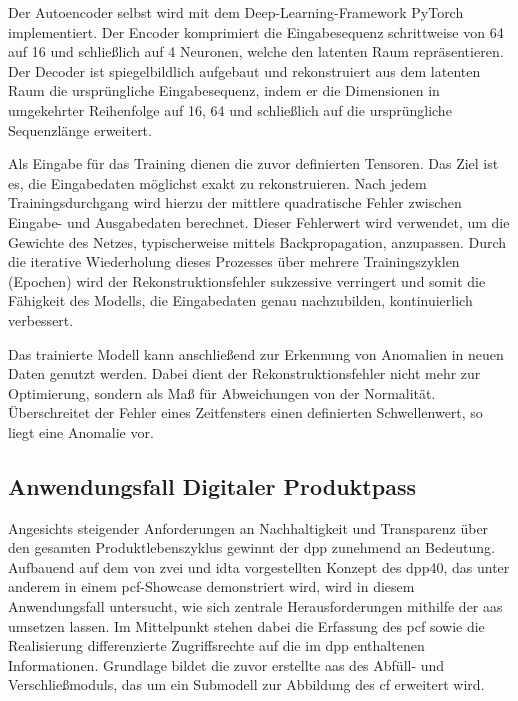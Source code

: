 Der Autoencoder selbst wird mit dem Deep-Learning-Framework PyTorch \cite{PyTorch} implementiert.
Der Encoder komprimiert die Eingabesequenz schrittweise von 64 auf 16 und schließlich auf 4 Neuronen, welche den latenten Raum repräsentieren.
Der Decoder ist spiegelbildlich aufgebaut und rekonstruiert aus dem latenten Raum die ursprüngliche Eingabesequenz, indem er die Dimensionen in umgekehrter Reihenfolge auf 16, 64 und schließlich auf die ursprüngliche Sequenzlänge erweitert.

Als Eingabe für das Training dienen die zuvor definierten Tensoren.
Das Ziel ist es, die Eingabedaten möglichst exakt zu rekonstruieren.
Nach jedem Trainingsdurchgang wird hierzu der mittlere quadratische Fehler zwischen Eingabe- und Ausgabedaten berechnet.
Dieser Fehlerwert wird verwendet, um die Gewichte des Netzes, typischerweise mittels Backpropagation, anzupassen.
Durch die iterative Wiederholung dieses Prozesses über mehrere Trainingszyklen (Epochen) wird der Rekonstruktionsfehler sukzessive verringert und somit die Fähigkeit des Modells, die Eingabedaten genau nachzubilden, kontinuierlich verbessert.

Das trainierte Modell kann anschließend zur Erkennung von Anomalien in neuen Daten genutzt werden.
Dabei dient der Rekonstruktionsfehler nicht mehr zur Optimierung, sondern als Maß für Abweichungen von der Normalität.
Überschreitet der Fehler eines Zeitfensters einen definierten Schwellenwert, so liegt eine Anomalie vor.

\newpage
\subsection{Anwendungsfall Digitaler Produktpass}
Angesichts steigender Anforderungen an Nachhaltigkeit und Transparenz über den gesamten Produktlebenszyklus gewinnt der \acs{dpp} zunehmend an Bedeutung.
Aufbauend auf dem von \acs{zvei} und \acs{idta} vorgestellten Konzept des \acs{dpp40}, das unter anderem in einem \acs{pcf}-Showcase \cite{PCFShowcas} demonstriert wird, wird in diesem Anwendungsfall untersucht, wie sich zentrale Herausforderungen mithilfe der \acs{aas} umsetzen lassen.
Im Mittelpunkt stehen dabei die Erfassung des \acs{pcf} sowie die Realisierung differenzierte Zugriffsrechte auf die im \acs{dpp} enthaltenen Informationen.
Grundlage bildet die zuvor erstellte \acs{aas} des Abfüll- und Verschließmoduls, das um ein Submodell zur Abbildung des \acs{cf} erweitert wird.

